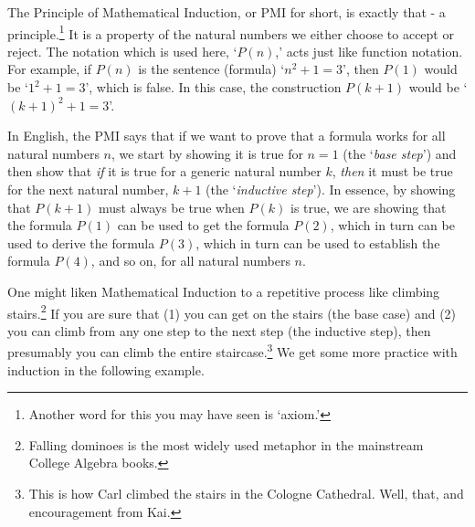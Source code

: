 \documentclass{ximera}
\begin{document}


\smallskip

 The Principle of Mathematical Induction, or PMI for short, is exactly that - a principle.\footnote{Another word for this you may have seen is `axiom.'}  It is a property of the natural numbers we either choose to accept or reject.  The notation which is used here, `$P(n)$,' acts just like function notation.  For example, if $P(n)$ is the sentence (formula)  `$n^2 + 1 = 3$', then $P(1)$ would be `$1^2 + 1 = 3$', which is false.  In this case, the construction $P(k+1)$ would be `$(k+1)^2 + 1 = 3$'.  

\smallskip

In English, the PMI says that if we want to prove that a formula works for all natural numbers $n$, we start by showing it is true for $n=1$ (the  `\textit{base step}') and then show that \textit{if} it is true for a generic natural number $k$, \textit{then} it must be true for the next natural number, $k+1$ (the  `\textit{inductive step}').  In essence, by showing that $P(k+1)$ must always be true when $P(k)$ is true, we are showing that the formula $P(1)$ can be used to get the formula $P(2)$, which in turn can be used to derive the formula $P(3)$, which in turn can be used to establish the formula $P(4)$, and so on, for all natural numbers $n$.


\smallskip

One might liken Mathematical Induction to a repetitive process like climbing stairs.\footnote{Falling dominoes is the most widely used metaphor in the mainstream College Algebra books.}  If you are sure that (1) you can get on the stairs (the base case) and (2) you can climb from any one step to the next step (the inductive step), then presumably you can climb the entire staircase.\footnote{This is how Carl climbed the stairs in the Cologne Cathedral.  Well, that, and  encouragement from  Kai.}  We get some more practice with induction in the following example.

\newpage
\end{document}
